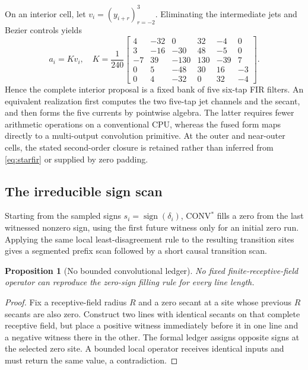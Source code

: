 \documentclass[journal]{IEEEtran}
\newtheorem{proposition}{Proposition}
\begin{document}
On an interior cell, let \(v_i=(y_{i+r})_{r=-2}^{3}\). Eliminating the
intermediate jets and Bezier controls yields
\begin{equation}
 a_i=Kv_i,\quad K=\frac1{240}
 \left[\begin{smallmatrix}
 4&-32&0&32&-4&0\\
 3&-16&-30&48&-5&0\\
 -7&39&-130&130&-39&7\\
 0&5&-48&30&16&-3\\
 0&4&-32&0&32&-4
 \end{smallmatrix}\right].
 \label{eq:starfir}
\end{equation}
Hence the complete interior proposal is a fixed bank of five six-tap FIR
filters. An equivalent realization first computes the two five-tap jet
channels and the secant, and then forms the five currents by pointwise
algebra. The latter requires fewer arithmetic operations on a conventional
CPU, whereas the fused form maps directly to a multi-output convolution
primitive. At the outer and near-outer cells, the stated second-order closure
is retained rather than inferred from \eqref{eq:starfir} or supplied by zero
padding.

\subsection{The irreducible sign scan}

Starting from the sampled signs
\(s_i=\operatorname{sign}(\delta_i)\), CONV$^{*}$ fills a zero from the last
witnessed nonzero sign, using the first future witness only for an initial
zero run. Applying the same local least-disagreement rule to the resulting
transition sites gives a segmented prefix scan followed by a short causal
transition scan.

\begin{proposition}[No bounded convolutional ledger]
No fixed finite-receptive-field operator can reproduce the zero-sign filling
rule for every line length.
\end{proposition}

\begin{proof}
Fix a receptive-field radius \(R\) and a zero secant at a site whose previous
\(R\) secants are also zero. Construct two lines with identical secants on
that complete receptive field, but place a positive witness immediately
before it in one line and a negative witness there in the other. The formal
ledger assigns opposite signs at the selected zero site. A bounded local
operator receives identical inputs and must return the same value, a
contradiction.
\end{proof}
\end{document}
